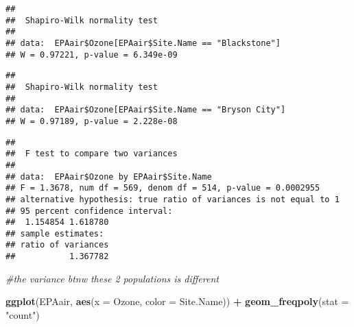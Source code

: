 \documentclass[]{article}
\newenvironment{Shaded}{\begin{snugshade}}{\end{snugshade}}
\newcommand{\KeywordTok}[1]{\textcolor[rgb]{0.13,0.29,0.53}{\textbf{#1}}}
\newcommand{\DataTypeTok}[1]{\textcolor[rgb]{0.13,0.29,0.53}{#1}}
\newcommand{\StringTok}[1]{\textcolor[rgb]{0.31,0.60,0.02}{#1}}
\newcommand{\CommentTok}[1]{\textcolor[rgb]{0.56,0.35,0.01}{\textit{#1}}}
\newcommand{\OperatorTok}[1]{\textcolor[rgb]{0.81,0.36,0.00}{\textbf{#1}}}
\newcommand{\NormalTok}[1]{#1}
\begin{document}
\begin{verbatim}
## 
##  Shapiro-Wilk normality test
## 
## data:  EPAair$Ozone[EPAair$Site.Name == "Blackstone"]
## W = 0.97221, p-value = 6.349e-09
\end{verbatim}

\begin{Shaded}
\end{Shaded}

\begin{verbatim}
## 
##  Shapiro-Wilk normality test
## 
## data:  EPAair$Ozone[EPAair$Site.Name == "Bryson City"]
## W = 0.97189, p-value = 2.228e-08
\end{verbatim}

\begin{Shaded}
\end{Shaded}

\begin{verbatim}
## 
##  F test to compare two variances
## 
## data:  EPAair$Ozone by EPAair$Site.Name
## F = 1.3678, num df = 569, denom df = 514, p-value = 0.0002955
## alternative hypothesis: true ratio of variances is not equal to 1
## 95 percent confidence interval:
##  1.154854 1.618780
## sample estimates:
## ratio of variances 
##           1.367782
\end{verbatim}

\begin{Shaded}
\begin{Highlighting}[]
\CommentTok{#the variance btnw these 2 populations is different}

\KeywordTok{ggplot}\NormalTok{(EPAair, }\KeywordTok{aes}\NormalTok{(}\DataTypeTok{x =}\NormalTok{ Ozone, }\DataTypeTok{color =}\NormalTok{ Site.Name)) }\OperatorTok{+}
\StringTok{  }\KeywordTok{geom_freqpoly}\NormalTok{(}\DataTypeTok{stat =} \StringTok{"count"}\NormalTok{)}
\end{Highlighting}
\end{Shaded}
\end{document}
